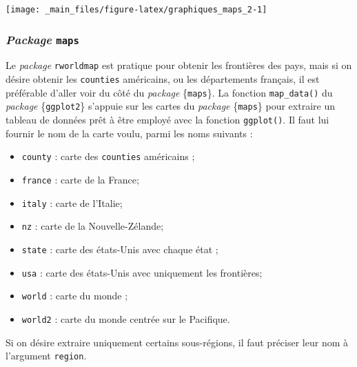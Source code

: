 \documentclass[
  11pt,
]{book}
\newenvironment{Shaded}{\begin{snugshade}}{\end{snugshade}}
\newcommand{\CommentTok}[1]{\textcolor[rgb]{0.56,0.35,0.01}{\textit{#1}}}
\newcommand{\KeywordTok}[1]{\textcolor[rgb]{0.13,0.29,0.53}{\textbf{#1}}}
\newcommand{\NormalTok}[1]{#1}
\newcommand{\OperatorTok}[1]{\textcolor[rgb]{0.81,0.36,0.00}{\textbf{#1}}}
\newcommand{\StringTok}[1]{\textcolor[rgb]{0.31,0.60,0.02}{#1}}
\providecommand{\tightlist}{%
  \setlength{\itemsep}{0pt}\setlength{\parskip}{0pt}}
\numberwithin{equation}{section}
\numberwithin{countremarque}{section}
\begin{document}
\begin{center}\texttt{[image: \_main\_files/figure-latex/graphiques\_maps\_2-1]} \end{center}

\hypertarget{graphiques_maps_recup_maps}{%
\subsubsection{\texorpdfstring{\emph{Package} \texttt{maps}}{Package }}\label{graphiques_maps_recup_maps}}

Le \emph{package} \texttt{rworldmap} est pratique pour obtenir les frontières des pays, mais si on désire obtenir les \texttt{counties} américains, ou les départements français, il est préférable d'aller voir du côté du \emph{package} \{\texttt{maps}\}. La fonction \texttt{map\_data()} du \emph{package} \{\texttt{ggplot2}\} s'appuie sur les cartes du \emph{package} \{\texttt{maps}\} pour extraire un tableau de données prêt à être employé avec la fonction \texttt{ggplot()}. Il faut lui fournir le nom de la carte voulu, parmi les noms suivants :

\begin{itemize}
\tightlist
\item
  \texttt{county} : carte des \texttt{counties} américains ;
\item
  \texttt{france} : carte de la France;
\item
  \texttt{italy} : carte de l'Italie;
\item
  \texttt{nz} : carte de la Nouvelle-Zélande;
\item
  \texttt{state} : carte des états-Unis avec chaque état ;
\item
  \texttt{usa} : carte des états-Unis avec uniquement les frontières;
\item
  \texttt{world} : carte du monde ;
\item
  \texttt{world2} : carte du monde centrée sur le Pacifique.
\end{itemize}

Si on désire extraire uniquement certains sous-régions, il faut préciser leur nom à l'argument \texttt{region}.

\begin{Shaded}
\end{Shaded}
\end{document}
